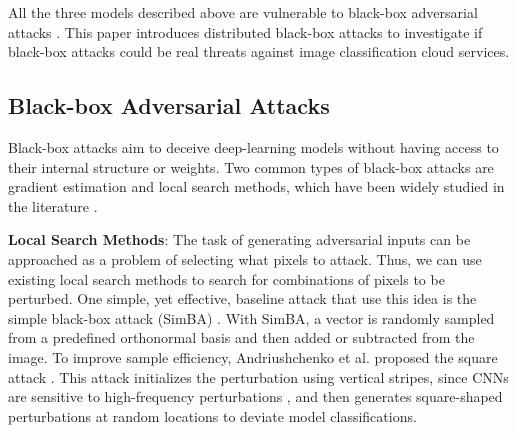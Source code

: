 
All the three models described above are vulnerable to black-box adversarial attacks \citep{szegedy2013intriguing, biggio2013evasion}. This paper introduces distributed black-box attacks to investigate if black-box attacks could be real threats against image classification cloud services.


\subsection{Black-box Adversarial Attacks}
\label{black_box}

Black-box attacks aim to deceive deep-learning models without having access to their internal structure or weights. Two common types of black-box attacks are gradient estimation and local search methods, which have been widely studied in the literature \citep{bhambri2019survey} \citep{wang2022black}.



\textbf{Local Search Methods}: The task of generating adversarial inputs can be approached as a problem of selecting what pixels to attack. Thus, we can use existing local search methods to search for combinations of pixels to be perturbed. One simple, yet effective, baseline attack that use this idea is the simple black-box attack (SimBA) \citep{guo2019simple}. With SimBA, a vector is randomly sampled from a predefined orthonormal basis and then added or subtracted from the image. To improve sample efficiency, Andriushchenko et al. proposed the square attack \citep{andriushchenko2020square}. This attack initializes the perturbation using vertical stripes, since CNNs are sensitive to high-frequency perturbations \citep{yin2019fourier}, and then generates square-shaped perturbations at random locations to deviate model classifications.

